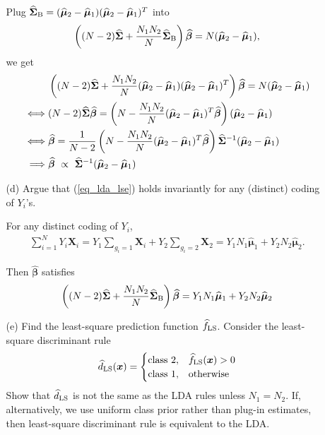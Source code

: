 \documentclass[10pt]{article}
\theoremstyle{definition}
\theoremstyle{remark}
\newcommand{\bx}{\bm{x}}
\newcommand{\bX}{\bm{X}}
\newcommand{\bbeta}{\bm{\beta}}
\newcommand{\bmu}{\bm{\mu}}
\newcommand{\bSigma}{\bm{\Sigma}}
\begin{document}
\begin{enumerate}
\begin{itemize}
		Plug $ \widehat{\bSigma}_{\rm B} = (\widehat{\bmu}_{2} - \widehat{\bmu}_{1})(\widehat{\bmu}_{2} - \widehat{\bmu}_{1})^{T} $ into
		\begin{align*}
		    \left( (N-2)\widehat{\bSigma} + {N_{1}N_{2} \over N}\widehat{\bSigma}_{\rm B} \right)\widehat{\bbeta} = N(\widehat{\bmu}_{2} - \widehat{\bmu}_{1}),
		\end{align*}
		we get 
		\begin{align*}
		    & \left( (N-2)\widehat{\bSigma} + {N_{1}N_{2} \over N}(\widehat{\bmu}_{2} - \widehat{\bmu}_{1})(\widehat{\bmu}_{2} - \widehat{\bmu}_{1})^{T}  \right)\widehat{\bbeta} = N(\widehat{\bmu}_{2} - \widehat{\bmu}_{1}) \\
		    \iff & (N-2)\widehat{\bSigma}\widehat{\bbeta} = \left(N-{N_{1}N_{2} \over N}(\widehat{\bmu}_{2} -\widehat{\bmu}_{1})^{T} \widehat{\bbeta}\right)(\widehat{\bmu}_{2} - \widehat{\bmu}_{1}) \\
		    \iff & \widehat{\bbeta} = \frac{1}{N-2} \left(N-{N_{1}N_{2} \over N}(\widehat{\bmu}_{2} -\widehat{\bmu}_{1})^{T} \widehat{\bbeta}\right)\widehat{\bSigma}^{-1}(\widehat{\bmu}_{2} - \widehat{\bmu}_{1}) \\
		    \implies & \widehat{\bbeta}\ \propto\ \widehat{\bSigma}^{-1}(\widehat{\bmu}_{2} - \widehat{\bmu}_{1})
		\end{align*}

		
		\item [(d)] Argue that (\ref{eq_lda_lse}) holds invariantly for any (distinct) coding of $ Y_{i} $'s.
		
		For any distinct coding of $Y_i$,
		\begin{align*}
		    \sum_{i=1}^{N} Y_i\bX_i = Y_1\sum_{g_i=1} \bX_i + Y_2\sum_{g_i=2} \bX_2 = Y_1N_1\widehat{\bmu}_{1} + Y_2N_2\widehat{\bmu}_{2}.
		\end{align*}
		
		Then $ \widehat{\bbeta} $ satisfies
		\[ \left( (N-2)\widehat{\bSigma} + {N_{1}N_{2} \over N}\widehat{\bSigma}_{\rm B} \right)\widehat{\bbeta} = Y_1N_1\widehat{\bmu}_{1} + Y_2N_2\widehat{\bmu}_{2} \]
		
		\item [(e)] Find the least-square prediction function $ \widehat{f}_{\rm LS} $. Consider the least-square discriminant rule
		\[ \widehat{d}_{\rm LS}(\bx) = \begin{cases}
		\text{class 2}, & \widehat{f}_{\rm LS}(\bx) > 0\\
		\text{class 1}, & \text{otherwise}
		\end{cases} \]
		Show that $ \widehat{d}_{\rm LS} $ is not the same as the LDA rules unless $ N_{1} = N_{2} $. If, alternatively, we use uniform class prior rather than plug-in estimates, then least-square discriminant rule is equivalent to the LDA.
		

\end{itemize}
\end{enumerate}
\end{document}
